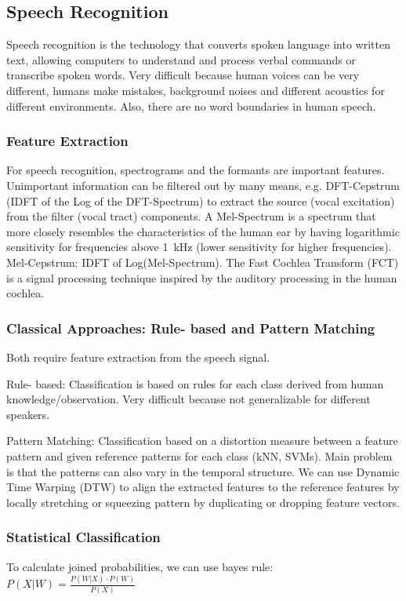 \subsection{Speech Recognition}
Speech recognition is the technology that converts spoken language into written text,
allowing computers to understand and process verbal commands or transcribe spoken words.
Very difficult because human voices can be very different, humans make mistakes, background noises and different acoustics for different environments.
Also, there are no word boundaries in human speech.

\subsubsection{Feature Extraction}
For speech recognition, spectrograms and the formants are important features.
Unimportant information can be filtered out by many means,
e.g. DFT-Cepstrum (IDFT of the Log of the DFT-Spectrum) to extract the source (vocal excitation) from the filter (vocal tract) components.
A Mel-Spectrum is a spectrum that more closely resembles the characteristics of the human ear by having logarithmic sensitivity
for frequencies above 1~kHz (lower sensitivity for higher frequencies).
Mel-Cepstrum: IDFT of Log(Mel-Spectrum). The Fast Cochlea Transform (FCT) is a signal processing technique inspired by the auditory processing in the human cochlea.

\subsubsection{Classical Approaches: Rule- based and Pattern Matching}
Both require feature extraction from the speech signal.

Rule- based: Classification is based on rules for each class derived from human knowledge/observation.
Very difficult because not generalizable for different speakers.

Pattern Matching: Classification based on a distortion measure between a feature pattern and given reference patterns for each class (kNN, SVMs).
Main problem is that the patterns can also vary in the temporal structure.
We can use Dynamic Time Warping (DTW) to align the extracted features to the reference features by
locally stretching or squeezing pattern by duplicating or dropping feature vectors.

\subsubsection{Statistical Classification}
To calculate joined probabilities, we can use bayes rule: $ P(X | W) = \frac{P(W | X) \cdot P(W)}{P(X)} $

